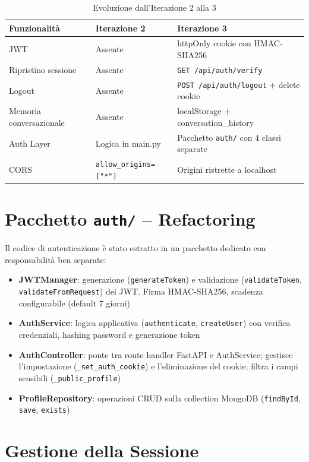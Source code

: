 \documentclass[a4paper,12pt]{report}
\begin{document}
\begin{table}[H]
\centering
\small
\begin{tabularx}{\textwidth}{l X X}
\toprule
\textbf{Funzionalità} & \textbf{Iterazione 2} & \textbf{Iterazione 3} \\
\midrule
JWT & Assente & httpOnly cookie con HMAC-SHA256 \\
Ripristino sessione & Assente & \texttt{GET /api/auth/verify} \\
Logout & Assente & \texttt{POST /api/auth/logout} + delete cookie \\
Memoria conversazionale & Assente & localStorage + conversation\_history \\
Auth Layer & Logica in main.py & Pacchetto \texttt{auth/} con 4 classi separate \\
CORS & \texttt{allow\_origins=["*"]} & Origini ristrette a localhost \\
\bottomrule
\end{tabularx}
\caption{Evoluzione dall'Iterazione 2 alla 3}
\end{table}

\section{Pacchetto \texttt{auth/} -- Refactoring}

Il codice di autenticazione è stato estratto in un pacchetto dedicato con responsabilità ben separate:

\begin{itemize}
    \item \textbf{JWTManager}: generazione (\texttt{generateToken}) e validazione (\texttt{validateToken}, \texttt{validateFromRequest}) dei JWT. Firma HMAC-SHA256, scadenza configurabile (default 7 giorni)
    \item \textbf{AuthService}: logica applicativa (\texttt{authenticate}, \texttt{createUser}) con verifica credenziali, hashing password e generazione token
    \item \textbf{AuthController}: ponte tra route handler FastAPI e AuthService; gestisce l'impostazione (\texttt{\_set\_auth\_cookie}) e l'eliminazione del cookie; filtra i campi sensibili (\texttt{\_public\_profile})
    \item \textbf{ProfileRepository}: operazioni CRUD sulla collection MongoDB (\texttt{findById}, \texttt{save}, \texttt{exists})
\end{itemize}

\section{Gestione della Sessione}
\end{document}
